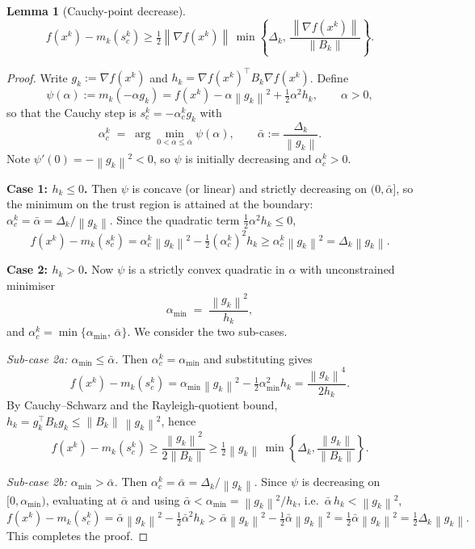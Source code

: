 \documentclass[11pt,a4paper]{report}
\theoremstyle{plain}
\newtheorem{lemma}[theorem]{Lemma}
\theoremstyle{definition}
\newcommand{\norm}[1]{\left\lVert#1\right\rVert}
\newcommand{\grad}{\nabla}
\newcommand{\trans}{^{\top}}
\begin{document}
\begin{lemma}[Cauchy-point decrease]\label{lem:cauchy}
\[
f(x^{k})-m_{k}(s^{k}_{c})\ge \tfrac12\norm{\grad f(x^{k})}\,
\min\!\left\{\Delta_{k},\,\frac{\norm{\grad f(x^{k})}}{\norm{B_{k}}}\right\}.
\]
\end{lemma}
\begin{proof}
  Write $g_k := \grad f(x^{k})$ and $h_{k}=\grad f(x^{k})\trans B_{k}\grad f(x^{k})$. Define
  \[
  \psi(\alpha) := m_k(-\alpha g_k)
              = f(x^{k}) - \alpha\norm{g_k}^{2} + \tfrac{1}{2}\alpha^{2} h_k,
  \qquad \alpha > 0,
  \]
  so that the Cauchy step is $s^{k}_c = -\alpha^{k}_c g_k$ with
  \[
  \alpha^{k}_c \;=\; \arg\min_{0<\alpha\le\bar\alpha}\psi(\alpha),
  \qquad
  \bar\alpha := \frac{\Delta_k}{\norm{g_k}}.
  \]
  Note $\psi'(0) = -\norm{g_k}^{2} < 0$, so $\psi$ is initially decreasing
  and $\alpha^{k}_c > 0$.
  
  \noindent\textbf{Case 1: $h_k \le 0$.}\quad
  Then $\psi$ is concave (or linear) and strictly decreasing on
  $(0,\bar\alpha]$, so the minimum on the trust region is attained at the
  boundary: $\alpha^{k}_c = \bar\alpha = \Delta_k/\norm{g_k}$. Since the
  quadratic term $\tfrac12\alpha^{2}h_k \leq 0$,
  \[
  f(x^{k}) - m_k(s^{k}_c) = \alpha^{k}_c\norm{g_k}^{2} - \tfrac12(\alpha^{k}_c)^{2} h_k \geq \alpha^{k}_c\norm{g_k}^{2} = \Delta_k \norm{g_k}.
  \]
  
  \textbf{Case 2: $h_k > 0$.}\quad
  Now $\psi$ is a strictly convex quadratic in $\alpha$ with unconstrained
  minimiser
  \[
  \alpha_{\min} \;=\; \frac{\norm{g_k}^{2}}{h_k},
  \]
  and $\alpha^{k}_c = \min\{\alpha_{\min},\,\bar\alpha\}$. We consider the
  two sub-cases.
  
  \emph{Sub-case 2a: $\alpha_{\min} \le \bar\alpha$.}\quad
  Then $\alpha^{k}_c = \alpha_{\min}$ and substituting gives
  \[
  f(x^{k}) - m_k(s^{k}_c)
      = \alpha_{\min}\norm{g_k}^{2} - \tfrac12\alpha_{\min}^{2}h_k
      = \frac{\norm{g_k}^{4}}{2h_k}.
  \]
  By Cauchy--Schwarz and the Rayleigh-quotient bound,
  $h_k = g_k\trans B_k g_k \le \norm{B_k}\,\norm{g_k}^{2}$, hence
  \[
  f(x^{k}) - m_k(s^{k}_c)
    \ge \frac{\norm{g_k}^{2}}{2\norm{B_k}}
    \ge \tfrac12\norm{g_k}\,
            \min\left\{\Delta_k, \frac{\norm{g_k}}{\norm{B_k}}\right\}.
  \]
  
  \emph{Sub-case 2b: $\alpha_{\min} > \bar\alpha$.}\quad
  Then $\alpha^{k}_c = \bar\alpha = \Delta_k/\norm{g_k}$. Since $\psi$ is
  decreasing on $[0,\alpha_{\min})$, evaluating at $\bar\alpha$ and using
  $\bar\alpha < \alpha_{\min} = \norm{g_k}^{2}/h_k$, i.e.\
  $\bar\alpha\,h_k < \norm{g_k}^{2}$,
  \[
  f(x^{k}) - m_k(s^{k}_c)
    = \bar\alpha\norm{g_k}^{2} - \tfrac12\bar\alpha^{2}h_k
    > \bar\alpha\norm{g_k}^{2} - \tfrac12\bar\alpha\norm{g_k}^{2}
    = \tfrac12\bar\alpha\norm{g_k}^{2}
    = \tfrac12\Delta_k\norm{g_k}.
  \]
  This completes the proof.
\end{proof}
\end{document}
